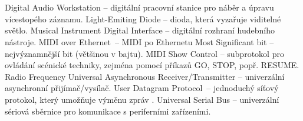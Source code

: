 \cleardoublepage
\chapter*{\listofabbrevname}
{}

\begin{acronym}[KolikMista]
    {Digital Audio Workstation -- digitální pracovní stanice pro náběr a úpravu vícestopého záznamu.}
    {Light-Emiting Diode -- dioda, která vyzařuje viditelné světlo.}
    {Musical Instrument Digital Interface -- digitální rozhraní hudebního nástroje.}
    {\acs{MIDI} over Ethernet~-- \acs{MIDI} po Ethernetu}
    {Most Significant bit -- nejvýznamnější bit (většinou v bajtu).}
    {\acs{MIDI} Show Control -- subprotokol pro ovládání scénické techniky, zejména pomocí příkazů GO, STOP, popř. RESUME. \cite{MIDIspecs}}
    {Radio Frequency}
    {Universal Asynchronous Receiver/Transmitter -- univerzální asynchronní přijímač/vysílač.}
    {User Datagram Protocol~-- jednoduchý síťový protokol, který umožňuje výměnu zpráv  \cite{UDPpaper}.}
    {Universal Serial Bus -- univerzální sériová sběrnice pro komunikace s periferními zařízeními.}







%
%

\end{acronym}
